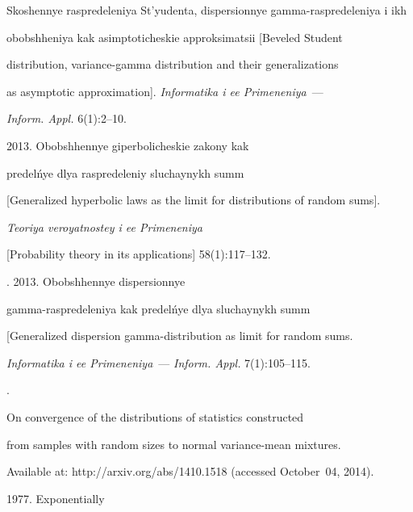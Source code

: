 Skoshennye raspredeleniya St'yudenta, dispersionnye gamma-raspredeleniya i ikh 


obobshheniya kak asimptoticheskie approksimatsii [Beveled Student 


distribution, variance-gamma distribution and their generalizations 


as asymptotic approximation]. {\it Informatika i ee Primeneniya}~---


\textit{Inform. Appl.} 6(1):2--10.







 2013. Obobshhennye giperbolicheskie zakony kak 


predel\'nye dlya raspredeleniy sluchaynykh summ 


[Generalized hyperbolic laws as the limit for distributions of random sums]. 


{\it Teoriya veroyatnostey i ee Primeneniya} 


[Probability theory in its applications] 58(1):117--132.







. 2013. Obobshhennye dispersionnye 


gamma-raspredeleniya kak predel\'nye dlya sluchaynykh summ 


[Generalized dispersion gamma-distribution as limit for random sums. 


{\it Informatika i ee Primeneniya}~--- \textit{Inform. Appl.} 7(1):105--115.







. 


On convergence of the distributions of statistics constructed 


from samples with random sizes to normal variance-mean mixtures. 


Available at: {\sf http://arxiv.org/abs/1410.1518} (accessed October~04,  2014).







 1977. Exponentially 


